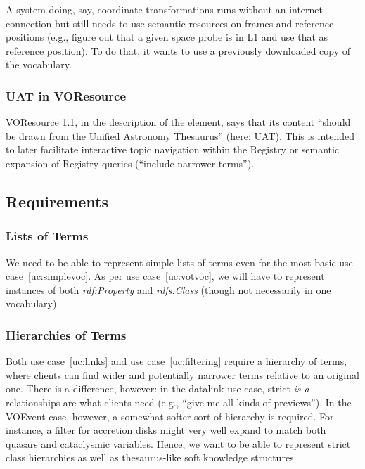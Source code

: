 \documentclass[11pt,a4paper]{ivoa}
\newcommand{\vocterm}[1]{\emph{\color{termcolor}#1}}
\begin{document}
A system doing, say, coordinate transformations runs without an internet
connection but still needs to use semantic resources on frames and
reference positions (e.g., figure out that a given space probe is in L1
and use that as reference position).  To do that, it wants to use a
previously downloaded copy of the vocabulary.

\subsubsection{UAT in VOResource}
\label{uc:uat}

VOResource 1.1, in the description of the  element, says
that its content ``should be drawn from the Unified Astronomy Thesaurus''
(here: UAT).  This is intended to later facilitate interactive topic
navigation within the Registry or semantic expansion of Registry queries
(``include narrower terms'').


\subsection{Requirements}
\label{sect:requirements}

\subsubsection{Lists of Terms}
\label{req:lists}

We need to be able to represent simple lists of terms even for the most
basic use case~\ref{uc:simplevoc}.  As per
use case~\ref{uc:votvoc}, we will have to represent instances of both
\vocterm{rdf:Property} and \vocterm{rdfs:Class} (though not necessarily
in one vocabulary).

\subsubsection{Hierarchies of Terms}
\label{req:hierarchy}

Both use case~\ref{uc:links} and use case~\ref{uc:filtering} require a hierarchy
of terms, where clients can find wider and potentially narrower terms
relative to an original one.  There is a difference,
however: in the datalink use-case, strict \vocterm{is-a} relationships
are what clients need (e.g., ``give me all kinds of previews'').  In the
VOEvent case, however, a somewhat softer sort of hierarchy is required.
For instance, a filter for accretion disks might very well expand to
match both quasars and cataclysmic variables.  Hence, we want to
be able to represent strict class hierarchies as well as thesaurus-like
soft knowledge structures.
\end{document}
